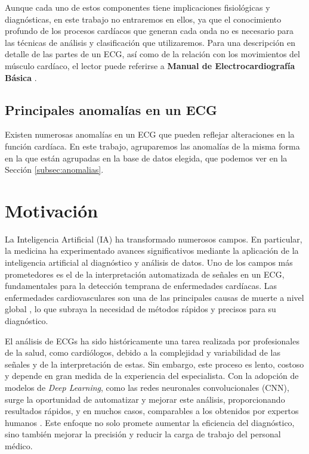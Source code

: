 Aunque cada uno de estos componentes tiene implicaciones fisiológicas y diagnósticas, en este trabajo no entraremos en ellos, ya que el conocimiento profundo de los procesos cardíacos que generan cada onda no es necesario para las técnicas de análisis y clasificación que utilizaremos. Para una descripción en detalle de las partes de un ECG, así como de la relación con los movimientos del músculo cardíaco, el lector puede referirse a \textbf{Manual de Electrocardiografía Básica} \cite{manualelectro}.

\subsection{Principales anomalías en un ECG}

Existen numerosas anomalías en un ECG que pueden reflejar alteraciones en la función cardíaca. En este trabajo, agruparemos las anomalías de la misma forma en la que están agrupadas en la base de datos elegida, que podemos ver en la Sección \ref{subsec:anomalias}.


\section{Motivación}
La Inteligencia Artificial (IA) ha transformado numerosos campos. En particular, la medicina ha experimentado avances significativos mediante la aplicación de la inteligencia artificial al diagnóstico y análisis de datos. Uno de los campos más prometedores es el de la interpretación automatizada de señales en un ECG, fundamentales para la detección temprana de enfermedades cardíacas. Las enfermedades cardiovasculares son una de las principales causas de muerte a nivel global \citep{whocvd}, lo que subraya la necesidad de métodos rápidos y precisos para su diagnóstico.

El análisis de ECGs ha sido históricamente una tarea realizada por profesionales de la salud, como cardiólogos, debido a la complejidad y variabilidad de las señales y de la interpretación de estas. Sin embargo, este proceso es lento, costoso y depende en gran medida de la experiencia del especialista. Con la adopción de modelos de \emph{Deep Learning}, como las redes neuronales convolucionales (CNN), surge la oportunidad de automatizar y mejorar este análisis, proporcionando resultados rápidos, y en muchos casos, comparables a los obtenidos por expertos humanos \citep{hannun_cardiologist_2019}. Este enfoque no solo promete aumentar la eficiencia del diagnóstico, sino también mejorar la precisión y reducir la carga de trabajo del personal médico.

